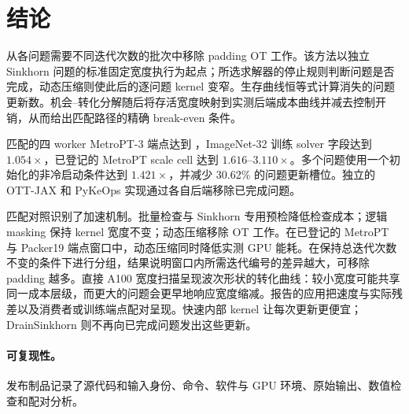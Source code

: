 \section{结论}
\label{sec:conclusion}

\policy{} 从各问题需要不同迭代次数的批次中移除 padding OT 工作。该方法以独立 Sinkhorn 问题的标准固定宽度执行为起点；所选求解器的停止规则判断问题是否完成，动态压缩则使此后的逐问题 kernel 变窄。生存曲线恒等式计算消失的问题更新数。机会--转化分解随后将存活宽度映射到实测后端成本曲线并减去控制开销，从而给出匹配路径的精确 break-even 条件。

匹配的四 worker MetroPT-3 端点达到 \CMetroCorrectedEndpointSpeedup{}，ImageNet-32 训练 solver 字段达到 $1.054\times$，已登记的 MetroPT scale cell 达到 $1.616$--$3.110\times$。多个问题使用一个初始化的非冷启动条件达到 $1.421\times$，并减少 30.62\% 的问题更新槽位。独立的 OTT-JAX 和 PyKeOps 实现通过各自后端移除已完成问题。

匹配对照识别了加速机制。批量检查与 Sinkhorn 专用预检降低检查成本；逻辑 masking 保持 kernel 宽度不变；动态压缩移除 OT 工作。在已登记的 MetroPT 与 Packer19 端点窗口中，动态压缩同时降低实测 GPU 能耗。在保持总迭代次数不变的条件下进行分组，结果说明窗口内所需迭代编号的差异越大，可移除 padding 越多。直接 A100 宽度扫描呈现波次形状的转化曲线：较小宽度可能共享同一成本层级，而更大的问题会更早地响应宽度缩减。报告的应用把速度与实际残差以及消费者或训练端点配对呈现。快速内部 kernel 让每次更新更便宜；DrainSinkhorn 则不再向已完成问题发出这些更新。

\paragraph{可复现性。}
发布制品记录了源代码和输入身份、命令、软件与 GPU 环境、原始输出、数值检查和配对分析。
